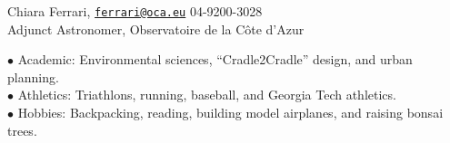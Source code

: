 \documentclass[11pt]{cv}
\begin{document}
\begin{llist}
Chiara Ferrari, \href{mailto:ferrari@oca.eu}{\tt ferrari@oca.eu} \hfill 04-9200-3028\\
Adjunct Astronomer, Observatoire de la C\^ote d'Azur


$\bullet$ Academic: Environmental sciences, ``Cradle2Cradle'' design, and urban planning.\\
$\bullet$ Athletics: Triathlons, running, baseball, and Georgia Tech athletics.\\
$\bullet$ Hobbies: Backpacking, reading, building model airplanes, and raising bonsai trees.

\end{llist}
\end{document}
